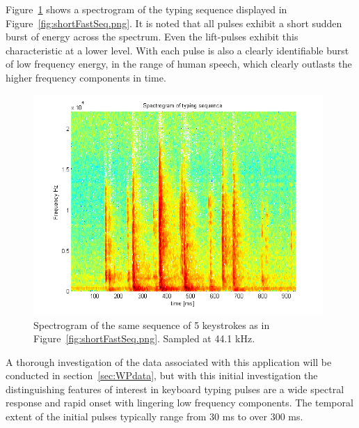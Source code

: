 Figure~\ref{fig:shortFastSeqSpec.png} shows a spectrogram of the typing sequence displayed in Figure~\ref{fig:shortFastSeq.png}. It is noted that all pulses exhibit a short sudden burst of energy across the spectrum. Even the lift-pulses exhibit this characteristic at a lower level. With each pulse is also a clearly identifiable burst of low frequency energy, in the range of human speech, which clearly outlasts the higher frequency components in time.

\begin{figure}
  \begin{center}
    \includegraphics[width=110mm]{shortFastSeqSpec.png}
    \caption{Spectrogram of the same sequence of 5 keystrokes as in Figure~\ref{fig:shortFastSeq.png}. Sampled at 44.1 kHz.}\label{fig:shortFastSeqSpec.png}
  \end{center}
\end{figure}

A thorough investigation of the data associated with this application will be conducted in section~\ref{sec:WPdata}, but with this initial investigation the distinguishing features of interest in keyboard typing pulses are a wide spectral response and rapid onset with lingering low frequency components. The temporal extent of the initial pulses typically range from 30 ms to over 300 ms.


